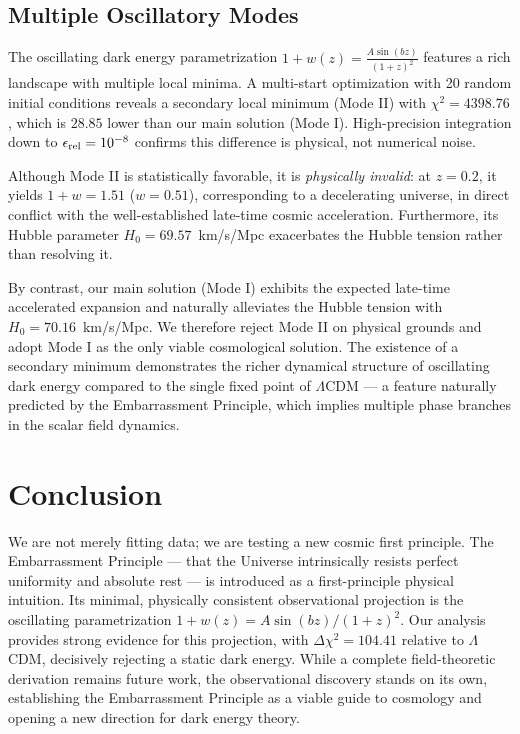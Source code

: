 \documentclass[10pt,twocolumn]{article}
\begin{document}
\subsection{Multiple Oscillatory Modes}
The oscillating dark energy parametrization $1+w(z)=\frac{A\sin(bz)}{(1+z)^2}$
features a rich landscape with multiple local minima.
A multi-start optimization with 20 random initial conditions
reveals a secondary local minimum (Mode II) with $\chi^2=4398.76$,
which is $28.85$ lower than our main solution (Mode I).
High-precision integration down to $\epsilon_{\rm rel}=10^{-8}$ confirms
this difference is physical, not numerical noise.

Although Mode II is statistically favorable,
it is \emph{physically invalid}: at $z=0.2$, it yields
$1+w=1.51$ ($w=0.51$), corresponding to a decelerating universe,
in direct conflict with the well-established late-time cosmic acceleration.
Furthermore, its Hubble parameter $H_0=69.57$~km/s/Mpc
exacerbates the Hubble tension rather than resolving it.

By contrast, our main solution (Mode I)
exhibits the expected late-time accelerated expansion
and naturally alleviates the Hubble tension with $H_0=70.16$~km/s/Mpc.
We therefore reject Mode II on physical grounds
and adopt Mode I as the only viable cosmological solution.
The existence of a secondary minimum demonstrates
the richer dynamical structure of oscillating dark energy
compared to the single fixed point of $\Lambda$CDM — a feature naturally predicted by the Embarrassment Principle, which implies multiple phase branches in the scalar field dynamics.

\section{Conclusion}
We are not merely fitting data; we are testing a new cosmic first principle.
The Embarrassment Principle — that the Universe intrinsically resists perfect uniformity and absolute rest — is introduced as a first-principle physical intuition.
Its minimal, physically consistent observational projection is the oscillating parametrization $1+w(z)=A\sin(bz)/(1+z)^2$.
Our analysis provides strong evidence for this projection, with $\Delta\chi^2=104.41$ relative to $\Lambda$CDM, decisively rejecting a static dark energy.
While a complete field-theoretic derivation remains future work, the observational discovery stands on its own, establishing the Embarrassment Principle as a viable guide to cosmology and opening a new direction for dark energy theory.
\end{document}
